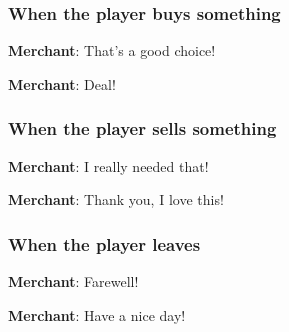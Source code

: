 \subsubsection*{When the player buys something}

\textbf{Merchant}: That's a good choice!

\textbf{Merchant}: Deal!


\subsubsection*{When the player sells something}

\textbf{Merchant}: I really needed that!

\textbf{Merchant}: Thank you, I love this!


\subsubsection*{When the player leaves}

\textbf{Merchant}: Farewell!

\textbf{Merchant}: Have a nice day!